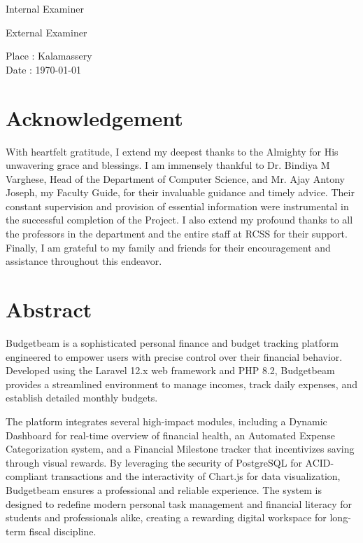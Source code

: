 \vspace{1.5cm}

\noindent
\begin{minipage}[t]{0.45\textwidth}
\flushleft
Internal Examiner
\end{minipage}
\hfill
\begin{minipage}[t]{0.45\textwidth}
\addtolength{\leftskip}{2cm}
External Examiner
\end{minipage}

\vspace{1.5cm}

\noindent
\begin{minipage}[t]{0.45\textwidth}
\flushleft
Place : Kalamassery\\
Date : \today
\end{minipage}

\chapter*{Acknowledgement}
With heartfelt gratitude, I extend my deepest thanks to the Almighty for His unwavering grace and blessings. I am immensely thankful to Dr. Bindiya M Varghese, Head of the Department of Computer Science, and Mr. Ajay Antony Joseph, my Faculty Guide, for their invaluable guidance and timely advice. Their constant supervision and provision of essential information were instrumental in the successful completion of the Project. I also extend my profound thanks to all the professors in the department and the entire staff at RCSS for their support. Finally, I am grateful to my family and friends for their encouragement and assistance throughout this endeavor.

\chapter*{Abstract}
Budgetbeam is a sophisticated personal finance and budget tracking platform engineered to empower users with precise control over their financial behavior. Developed using the Laravel 12.x web framework and PHP 8.2, Budgetbeam provides a streamlined environment to manage incomes, track daily expenses, and establish detailed monthly budgets.

The platform integrates several high-impact modules, including a Dynamic Dashboard for real-time overview of financial health, an Automated Expense Categorization system, and a Financial Milestone tracker that incentivizes saving through visual rewards. By leveraging the security of PostgreSQL for ACID-compliant transactions and the interactivity of Chart.js for data visualization, Budgetbeam ensures a professional and reliable experience. The system is designed to redefine modern personal task management and financial literacy for students and professionals alike, creating a rewarding digital workspace for long-term fiscal discipline.
